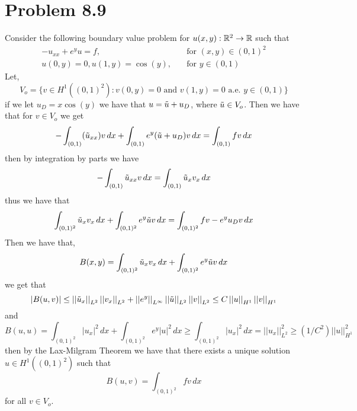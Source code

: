 \documentclass[12pt]{report}
\newcommand{\norm}[1]{\left|\left|#1\right|\right|}
\begin{document}
\section*{Problem 8.9}
Consider the following boundary value problem for $u(x,y): \mathbb{R}^2 \to \mathbb{R}$ such that
\begin{align*}
  -u_{xx} + e^yu = f, \quad &\text{for } (x,y) \in (0,1)^2 \\
  u(0,y) = 0, u(1,y) = \cos(y), \quad &\text{for } y\in(0,1)
\end{align*}
Let,
\begin{equation*}
  V_o = \{v \in H^1((0,1)^2): v(0,y) = 0 \text{ and } v(1,y) = 0 \text{ a.e. } y \in (0,1)\}
\end{equation*}
if we let $u_D = x\cos(y)$ we have that $u = \Tilde{u} + u_D$, where $\Tilde{u} \in V_o$.  Then we have that for $v \in V_o$ we get
\begin{equation*}
  -\int_{(0,1)} (\Tilde{u}_{xx})v \, dx + \int_{(0,1)}e^y (\Tilde{u} + u_D) v \, dx = \int_{(0,1)} f v \, dx
\end{equation*}
then by integration by parts we have
\begin{equation*}
-\int_{(0,1)} \Tilde{u}_{xx} v \, dx = \int_{(0,1)} \Tilde{u}_x v_x \, dx
\end{equation*}
thus we have that
\begin{equation*}
  \int_{(0,1)^2} \Tilde{u}_x v_x \, dx + \int_{(0,1)^2} e^y 
\Tilde{u} v \, dx = \int_{(0,1)^2} f v - e^yu_Dv\, dx
\end{equation*}
Then we have that,
\begin{equation*}
  B(x,y) = \int_{(0,1)^2} \Tilde{u}_x v_x \, dx + \int_{(0,1)^2} e^y \Tilde{u}v \, dx
\end{equation*}
we get that
\begin{equation*}
  |B(u,v)| \leq \norm{\Tilde{u}_x}_{L^2} \norm{v_x}_{L^2} + \norm{e^y}_{L^\infty} \norm{\Tilde{u}}_{L^2} \norm{v}_{L^2} \leq C \norm{u}_{H^1} \norm{v}_{H^1}
\end{equation*}
and
\begin{equation*}
  B(u,u) = \int_{(0,1)^2} |u_x|^2 \, dx + \int_{(0,1)^2} e^y |u|^2 \, dx \geq \int_{(0,1)^2} |u_x|^2 \, dx = \norm{u_x}_{L^2}^2 \geq (1/C^2) \norm{u}_{H^1}^2
\end{equation*}
then by the Lax-Milgram Theorem we have that there exists a unique solution $u \in H^1((0,1)^2)$ such that
\begin{equation*}
  B(u,v) = \int_{(0,1)^2} f v \, dx
\end{equation*}
for all $v \in V_o$.
\end{document}
